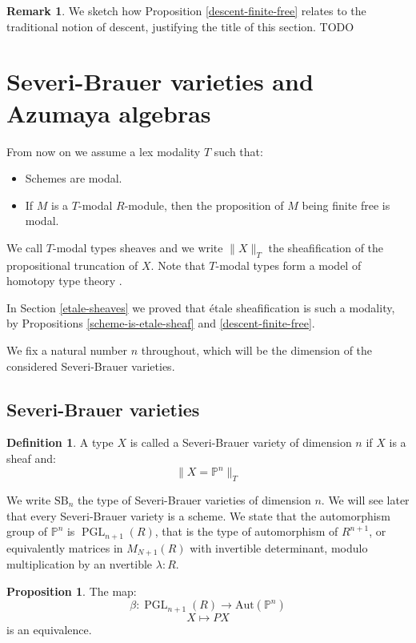 \documentclass[10pt,a4paper]{article}
\theoremstyle{definition}
\newtheorem{definition}[theorem]{Definition}
\newtheorem{remark}[theorem]{Remark}
\newtheorem{proposition}[theorem]{Proposition}
\DeclareMathOperator{\PGL}{PGL}
\newcommand{\SB}{\mathrm{SB}}
\newcommand{\propTrunc}[1]{\lVert #1 \rVert}
\newcommand{\bP}{\mathbb{P}}
\newcommand{\Aut}{\mathrm{Aut}}
\begin{document}
\begin{remark}
We sketch how Proposition \ref{descent-finite-free} relates to the traditional notion of descent, justifying the title of this section. TODO
\end{remark}




\section{Severi-Brauer varieties and Azumaya algebras}

From now on we assume a lex modality $T$ such that:
\begin{itemize}
\item Schemes are modal.
\item If $M$ is a $T$-modal $R$-module, then the proposition of $M$ being finite free is modal.
\end{itemize}
We call $T$-modal types sheaves and we write $\propTrunc{X}_T$ the sheafification of the propositional truncation of $X$. Note that $T$-modal types form a model of homotopy type theory \cite{modalities,Quirin16}.

In Section \ref{etale-sheaves} we proved that étale sheafification is such a modality, by Propositions \ref{scheme-is-etale-sheaf} and \ref{descent-finite-free}.

We fix a natural number $n$ throughout, which will be the dimension of the considered Severi-Brauer varieties.



\subsection{Severi-Brauer varieties}

\begin{definition}
A type $X$ is called a Severi-Brauer variety of dimension $n$ if $X$ is a sheaf and:
\[\propTrunc{X=\bP^n}_T\]
\end{definition}

We write $\SB_n$ the type of Severi-Brauer varieties of dimension $n$. We will see later that every Severi-Brauer variety is a scheme. We state that the automorphism group of $\bP^n$ is $\PGL_{n+1}(R)$, that is the type of automorphism of $R^{n+1}$, or equivalently matrices in $M_{N+1}(R)$ with invertible determinant, modulo multiplication by an nvertible $\lambda:R$.

\begin{proposition}\label{Aut-Pn-PGL}
The map:
\[\beta:\PGL_{n+1}(R)\to\Aut(\bP^n)\]
\[X\mapsto PX\]
is an equivalence.
\end{proposition}
\end{document}
